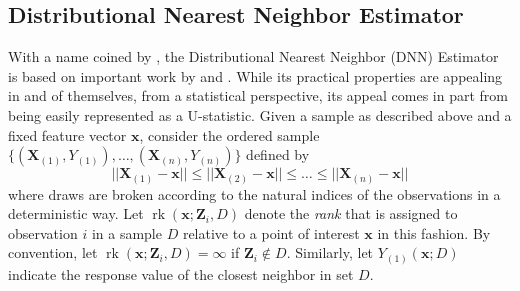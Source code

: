 \documentclass[letterpaper,10pt]{article}
\numberwithin{equation}{section}
\numberwithin{theorem}{section}
\numberwithin{remark}{section}
\numberwithin{example}{section}
\theoremstyle{definition}
\newcommand{\1}{\mathbb{1}}
\begin{document}
\subsection{Distributional Nearest Neighbor Estimator}
With a name coined by \citet{demirkaya_optimal_2024}, the Distributional Nearest Neighbor (DNN) Estimator is based on important work by \citet{steele_exact_2009} and \citet{biau_rate_2010}.
While its practical properties are appealing in and of themselves, from a statistical perspective, its appeal comes in part from being easily represented as a U-statistic.
Given a sample as described above and a fixed feature vector $\mathbf{x}$, consider the ordered sample $\{(\mathbf{X}_{(1)}, Y_{(1)}), \dotsc, (\mathbf{X}_{(n)}, Y_{(n)})\}$ defined by
\begin{equation}\label{ordering}
	||\mathbf{X}_{(1)} - \mathbf{x}|| \leq ||\mathbf{X}_{(2)} - \mathbf{x}|| \leq \dotsc \leq ||\mathbf{X}_{(n)} - \mathbf{x}||
\end{equation}
where draws are broken according to the natural indices of the observations in a deterministic way.
Let $\operatorname{rk}(\mathbf{x}; \mathbf{Z}_i, D)$ denote the \textit{rank} that is assigned to observation $i$ in a sample $D$ relative to a point of interest $\mathbf{x}$ in this fashion.
By convention, let $\operatorname{rk}(\mathbf{x}; \mathbf{Z}_i, D) = \infty$ if $\mathbf{Z}_i \not\in D$.
Similarly, let $Y_{(1)}(\mathbf{x}; D)$ indicate the response value of the closest neighbor in set $D$.
\end{document}
